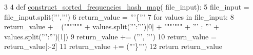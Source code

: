 \begin{DoxyCode}
3 
4 \textcolor{keyword}{def }\hyperlink{namespacefrequency__sorter__generator_a4e5d2ba44e86d8d0b09d71d55d8caecb}{construct\_sorted\_frequencies\_hash\_map}(
      file\_input):
5     file\_input = file\_input.split(\textcolor{stringliteral}{''','''})
6     return\_value = \textcolor{stringliteral}{'''\{'''}
7     \textcolor{keywordflow}{for} values \textcolor{keywordflow}{in} file\_input:
8         return\_value += (\textcolor{stringliteral}{"""'"""} + values.split(\textcolor{stringliteral}{''':'''})[0] + \textcolor{stringliteral}{"""'"""} + \textcolor{stringliteral}{''' : 
      '''} + values.split(\textcolor{stringliteral}{''':'''})[1])
9         return\_value += (\textcolor{stringliteral}{''', '''})
10     return\_value = return\_value[:-2]
11     return\_value += (\textcolor{stringliteral}{'''\}'''})
12     \textcolor{keywordflow}{return} return\_value

\end{DoxyCode}


